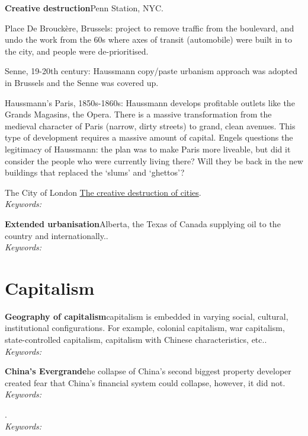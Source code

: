 \documentclass{article}
\newcommand{\entry}[3]{\textbf{#1}\quad #2. \\\textit{Keywords: #3}}
\begin{document}
\entry{Creative destruction}{Penn Station, NYC. 

Place De Brouckère, Brussels: project to remove traffic from the boulevard, and undo the work from the 60s where axes of transit (automobile) were built in to the city, and people were de-prioritised. 

Senne, 19-20th century: Haussmann copy/paste urbanism approach was adopted in Brussels and the Senne was covered up.

Haussmann's Paris, 1850s-1860s: Haussmann develops profitable outlets like the Grands Magasins, the Opera. There is a massive transformation from the medieval character of Paris (narrow, dirty streets) to grand, clean avenues. This type of development requires a massive amount of capital. Engels questions the legitimacy of Haussmann: the plan was to make Paris more liveable, but did it consider the people who were currently living there? Will they be back in the new buildings that replaced the ‘slums’ and ‘ghettos’?

The City of London \href{https://journals.sagepub.com/doi/pdf/10.1068/b3401ed}{The creative destruction of cities}}{}

\entry{Extended urbanisation}{Alberta, the Texas of Canada supplying oil to the country and internationally.}{}

\section{Capitalism}

\entry{Geography of capitalism}{capitalism is embedded in varying social, cultural, institutional configurations. For example, colonial capitalism, war capitalism, state-controlled capitalism, capitalism with Chinese characteristics, etc.}{}

\entry{China's Evergrande}{he collapse of China’s second biggest property developer created fear that China’s financial system could collapse, however, it did not}{}



\entry{}{}{}

\fi
\end{document}
